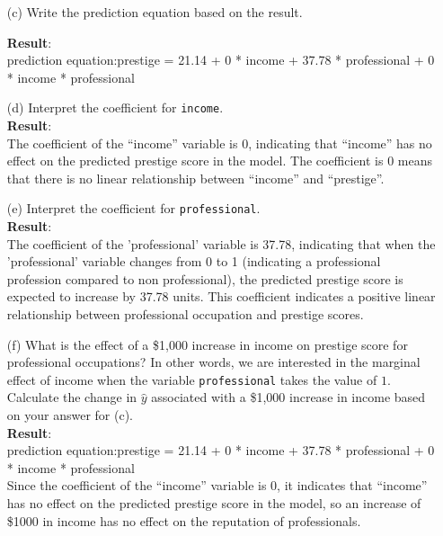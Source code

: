 \documentclass[12pt,letterpaper]{article}
\begin{document}
\begin{enumerate}
	\item [(c)]
	Write the prediction equation based on the result.
	
	\vspace{.25cm}
	 
	\textbf{Result}:\\
	prediction equation:prestige = 21.14 + 0 * income + 37.78 * professional + 0 * income * professional\\
	
	
	\item [(d)]
	Interpret the coefficient for \texttt{income}.
	\vspace{.25cm}\\
	\textbf{Result}:\\
	The coefficient of the ``income'' variable is 0, indicating that ``income'' has no effect on the predicted prestige score in the model. The coefficient is 0 means that there is no linear relationship between ``income'' and ``prestige''.
	\item [(e)]
	Interpret the coefficient for \texttt{professional}.
	\vspace{.25cm}\\
	\textbf{Result}:\\
		The coefficient of the 'professional' variable is 37.78, indicating that when the 'professional' variable changes from 0 to 1 (indicating a professional profession compared to non professional), the predicted prestige score is expected to increase by 37.78 units. This coefficient indicates a positive linear relationship between professional occupation and prestige scores.
	
	\item [(f)]
	What is the effect of a \$1,000 increase in income on prestige score for professional occupations? In other words, we are interested in the marginal effect of income when the variable \texttt{professional} takes the value of $1$. Calculate the change in $\hat{y}$ associated with a \$1,000 increase in income based on your answer for (c).
	\vspace{.25cm}\\
	\textbf{Result}:\\
	prediction equation:prestige = 21.14 + 0 * income + 37.78 * professional + 0 * income * professional\\
	Since the coefficient of the ``income'' variable is 0, it indicates that ``income'' has no effect on the predicted prestige score in the model, so an increase of \$1000 in income has no effect on the reputation of professionals.
	

\end{enumerate}
\end{document}
